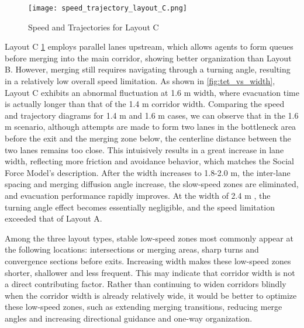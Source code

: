 \begin{figure}[h]
    \centering
    \texttt{[image: speed\_trajectory\_layout\_C.png]}
    \caption{Speed and Trajectories for Layout C}
    \label{fig:speed_trajectory_layout_C}
\end{figure}

Layout C \ref{fig:speed_trajectory_layout_C} employs parallel lanes upstream, which allows agents to form queues before merging into the main corridor, showing better organization than Layout B. However, merging still requires navigating through a turning angle, resulting in a relatively low overall speed limitation. As shown in \ref{fig:tet_vs_width}, Layout C exhibits an abnormal fluctuation at 1.6 m width, where evacuation time is actually longer than that of the 1.4 m corridor width. Comparing the speed and trajectory diagrams for 1.4 m and 1.6 m cases, we can observe that in the 1.6 m scenario, although attempts are made to form two lanes in the bottleneck area before the exit and the merging zone below, the centerline distance between the two lanes remains too close. This intuisively results in a great increase in lane width, reflecting more friction and avoidance behavior, which matches the Social Force Model's description. After the width increases to 1.8-2.0 m, the inter-lane spacing and merging diffusion angle increase, the slow-speed zones are eliminated, and evacuation performance rapidly improves. At the width of 2.4 m , the turning angle effect becomes essentially negligible, and the speed limitation exceeded that of Layout A.

Among the three layout types, stable low-speed zones most commonly appear at the following locations: intersections or merging areas, sharp turns and convergence sections before exits. Increasing width makes these low-speed zones shorter, shallower and less frequent. This may indicate that corridor width is not a direct contributing factor. Rather than continuing to widen corridors blindly when the corridor width is already relatively wide, it would be better to optimize these low-speed zones, such as extending merging transitions, reducing merge angles and increasing directional guidance and one-way organization.

